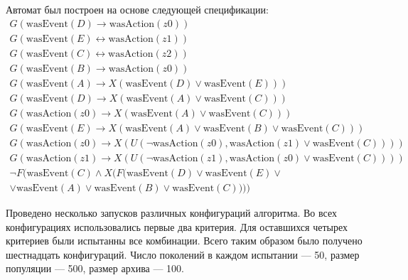 \documentclass[12pt,fleqn]{article}
\begin{document}
Автомат был построен на основе следующей спецификации:
\begin{multline*}
G(\text{wasEvent}(D) \rightarrow \text{wasAction}(z0))\\
G(\text{wasEvent}(E) \leftrightarrow \text{wasAction}(z1))\\
G(\text{wasEvent}(C) \leftrightarrow \text{wasAction}(z2))\\
G(\text{wasEvent}(B) \rightarrow \text{wasAction}(z0))\\
G(\text{wasEvent}(A) \rightarrow X(\text{wasEvent}(D) \vee \text{wasEvent}(E)))\\
G(\text{wasEvent}(D) \rightarrow X(\text{wasEvent}(A) \vee \text{wasEvent}(C)))\\
G(\text{wasAction}(z0) \rightarrow X(\text{wasEvent}(A) \vee \text{wasEvent}(C)))\\
G(\text{wasEvent}(E) \rightarrow X(\text{wasEvent}(A) \vee \text{wasEvent}(B) \vee \text{wasEvent}(C)))\\
G(\text{wasAction}(z0) \rightarrow X(U(\lnot \text{wasAction}(z0), \text{wasAction}(z1) \vee \text{wasEvent}(C))))\\
G(\text{wasAction}(z1) \rightarrow X(U(\lnot \text{wasAction}(z1), \text{wasAction}(z0) \vee \text{wasEvent}(C))))\\
\lnot F(\text{wasEvent}(C) \wedge X(F(\text{wasEvent}(D) \vee \text{wasEvent}(E) \vee \\ \vee \text{wasEvent}(A) \vee \text{wasEvent}(B) \vee \text{wasEvent}(C))))
\end{multline*}

Проведено несколько запусков различных конфигураций алгоритма. Во всех конфигурациях использовались первые два критерия.
Для оставшихся четырех критериев были испытанны все комбинации. Всего таким образом было получено шестнадцать конфигураций.
Число поколений в каждом испытании --- 50, размер популяции --- 500, размер архива --- 100.
\end{document}

